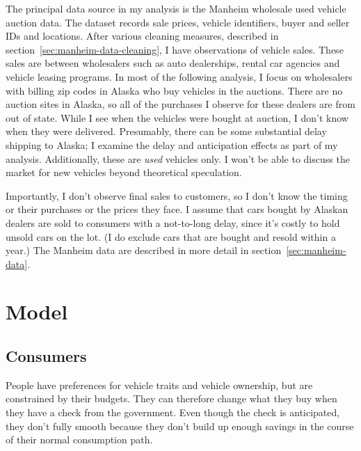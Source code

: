 \documentclass[11pt,letterpaper,oneside]{article}
\newcommand{\snippet}[1]{\hspace{-0.15em}}
\begin{document}
The principal data source in my analysis is the Manheim wholesale used vehicle auction data.
The dataset records sale prices, vehicle identifiers, buyer and seller IDs and locations.
After various cleaning measures, described in section~\ref{sec:manheim-data-cleaning}, I have
\snippet{auctions_cleaned_total_obs_count.tex}
observations of vehicle sales.
These sales are between wholesalers such as auto dealerships, rental car agencies and vehicle leasing programs.
In most of the following analysis, I focus on wholesalers with billing zip codes in Alaska who buy vehicles in the auctions.
There are no auction sites in Alaska, so all of the purchases I observe for these dealers are from out of state.
While I see when the vehicles were bought at auction, I don't know when they were delivered.
Presumably, there can be some substantial delay shipping to Alaska; I examine the delay and anticipation effects as part of my analysis.
Additionally, these are \emph{used} vehicles only.
I won't be able to discuss the market for new vehicles beyond theoretical speculation.


Importantly, I don't observe final sales to customers, so I don't know the timing or their purchases or the prices they face.
I assume that cars bought by Alaskan dealers are sold to consumers with a not-to-long delay, since it's costly to hold unsold cars on the lot.
(I do exclude cars that are bought and resold within a year.)
The Manheim data are described in more detail in section~\ref{sec:manheim-data}.



\section{Model}




\subsection{Consumers}


People have preferences for vehicle traits and vehicle ownership, but are constrained by their budgets.
They can therefore change what they buy when they have a check from the government.
Even though the check is anticipated, they don't fully smooth because they don't build up enough savings in the course of their normal consumption path.
\end{document}

